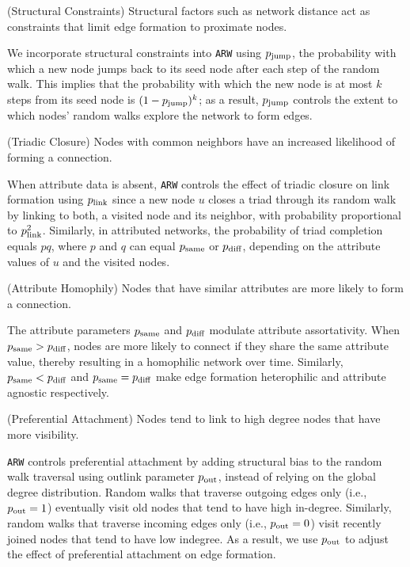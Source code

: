 \begin{ph}
	(Structural Constraints) Structural factors such as network distance
	act as constraints that limit edge formation to proximate nodes.  \cite{35626}
\end{ph}

We incorporate structural constraints into \texttt{ARW} using $p_{\scriptsize\mbox{jump}}$, the probability with
which a new node jumps back to its seed node after each step of the random walk. This implies
that the probability with which the new node is at most $k$ steps from its seed node is $(1-p_{\scriptsize\mbox{jump}})^k$;
as a result, $p_{\scriptsize\mbox{jump}}$ controls the extent to which nodes' random walks explore the network to form edges.

\begin{ph}
	(Triadic Closure) Nodes with common neighbors have an
	increased likelihood of forming a connection. \cite{simmel1950sociology}
\end{ph}

When attribute data is absent, \texttt{ARW} controls
the effect of triadic closure on link formation using $p_{\scriptsize\mbox{link}}$ since
a new node $u$ closes a triad through its random walk by linking to both, a visited node
and its neighbor, with probability proportional to $p_{\scriptsize\mbox{link}}^2$.
Similarly, in attributed networks, the probability of triad completion equals $pq$,
where $p$ and $q$ can equal $p_{\scriptsize\mbox{same}}$ or $p_{\scriptsize\mbox{diff}}$, depending on the attribute values of
$u$ and the visited nodes.

\begin{ph}
	(Attribute Homophily) Nodes that have similar attributes are more likely
	to form a connection. \cite{mcpherson2001birds}
\end{ph}
The attribute parameters $p_{\scriptsize\mbox{same}}$ and $p_{\scriptsize\mbox{diff}}$ modulate
attribute assortativity. When $p_{\scriptsize\mbox{same}} > p_{\scriptsize\mbox{diff}}$, nodes are more likely to connect if they share
the same attribute value, thereby resulting in a homophilic network over time. Similarly,
$p_{\scriptsize\mbox{same}} < p_{\scriptsize\mbox{diff}}$ and $p_{\scriptsize\mbox{same}}=p_{\scriptsize\mbox{diff}}$ make edge formation heterophilic and attribute agnostic respectively.

\begin{ph}
	(Preferential Attachment) Nodes tend to link to high degree nodes that have more
	visibility. \cite{barabasi1999emergence}
\end{ph}
\texttt{ARW} controls preferential attachment by adding structural bias to the
random walk traversal using outlink parameter $p_{\scriptsize\mbox{out}}$, instead of relying on the
global degree distribution. Random walks that traverse outgoing edges only
(i.e., $p_{\scriptsize\mbox{out}} =1$) eventually visit old nodes that tend to have high in-degree.
Similarly, random walks that traverse incoming edges only (i.e., $p_{\scriptsize\mbox{out}}=0$) visit
recently joined nodes that tend to have low indegree. As a result, we use
$p_{\scriptsize\mbox{out}}$ to adjust the effect of preferential attachment on edge formation.

